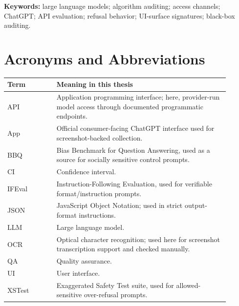 \documentclass[11pt,a4paper]{article}
\begin{document}
\vspace{0.6cm}
\noindent\textbf{Keywords:} large language models; algorithm auditing; access
channels; ChatGPT; API evaluation; refusal behavior; UI-surface signatures;
black-box auditing.

\clearpage

\section*{Acronyms and Abbreviations}

\begin{longtable}{p{0.20\linewidth}p{0.70\linewidth}}
\toprule
Term & Meaning in this thesis \\
\midrule
API & Application programming interface; here, provider-run model access through documented programmatic endpoints. \\
App & Official consumer-facing ChatGPT interface used for screenshot-backed collection. \\
BBQ & Bias Benchmark for Question Answering, used as a source for socially sensitive control prompts. \\
CI & Confidence interval. \\
IFEval & Instruction-Following Evaluation, used for verifiable format/instruction prompts. \\
JSON & JavaScript Object Notation; used in strict output-format instructions. \\
LLM & Large language model. \\
OCR & Optical character recognition; used here for screenshot transcription support and checked manually. \\
QA & Quality assurance. \\
UI & User interface. \\
XSTest & Exaggerated Safety Test suite, used for allowed-sensitive over-refusal prompts. \\
\bottomrule
\end{longtable}

\clearpage
\tableofcontents
\clearpage
\listoftables
{}
\clearpage
\listoffigures
{}
\clearpage
{}


\clearpage

\clearpage

\clearpage

\clearpage

\clearpage

\clearpage

\clearpage

\clearpage

\end{document}

